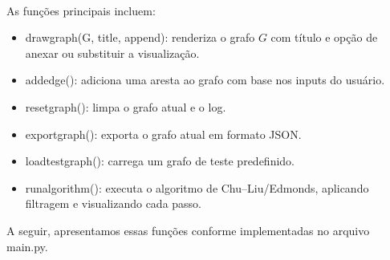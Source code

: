 \documentclass[12pt,a4paper]{article}
\def\texttt#1{#1}%
\def\_{}%
\begin{document}
\paragraph{}
As funções principais incluem:
\begin{itemize}\setlength{\itemsep}{2pt}
    \item \texttt{draw\_graph(G, title, append)}: renderiza o grafo \(G\) com título e opção de anexar ou substituir a visualização.
    \item \texttt{add\_edge()}: adiciona uma aresta ao grafo com base nos inputs do usuário.
    \item \texttt{reset\_graph()}: limpa o grafo atual e o log.
    \item \texttt{export\_graph()}: exporta o grafo atual em formato JSON.
    \item \texttt{load\_test\_graph()}: carrega um grafo de teste predefinido.
    \item \texttt{run\_algorithm()}: executa o algoritmo de Chu--Liu/Edmonds, aplicando filtragem e visualizando cada passo.
\end{itemize}

A seguir, apresentamos essas funções conforme implementadas no arquivo \texttt{main.py}.
\end{document}
